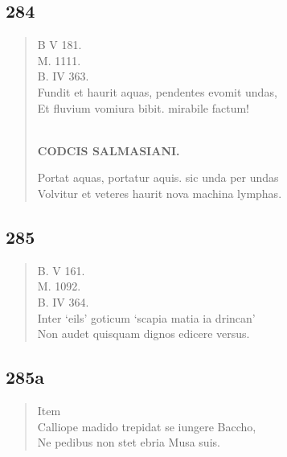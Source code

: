 \documentclass[11pt, a4paper]{report}
\begin{document}
            \subsection*{284}
      \begin{verse}
      B V 181. \\ M. 1111. \\ B. IV 363. \\ Fundit et haurit aquas, pendentes evomit undas, \\ Et fluvium vomiura bibit. mirabile factum! \\ 
        ﻿\pagebreak 
    \begin{center} \textbf{CODCIS SALMASIANI.} \end{center} \marginpar{[001]} Portat aquas, portatur aquis. sic unda per undas \\ Volvitur et veteres haurit nova machina lymphas. \\ 
      \end{verse}
  
            \subsection*{285}
      \begin{verse}
      B. V 161. \\ M. 1092. \\ B. IV 364. \\ Inter ‘eils’ goticum ‘scapia matia ia drincan’ \\ Non audet quisquam dignos edicere versus. \\ 
      \end{verse}
  
            \subsection*{285a}
      \begin{verse}
       \lbrack Item \rbrack  \\ Calliope madido trepidat se iungere Baccho, \\ Ne pedibus non stet ebria Musa suis. \\ 
      \end{verse}
  
\end{document}
